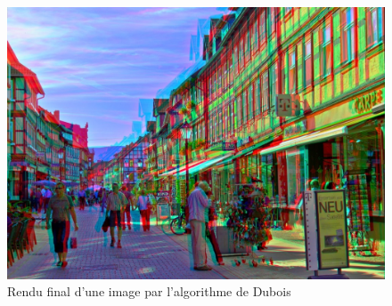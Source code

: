 \begin{figure}[H]
		\centering
		\includegraphics[scale=0.9]{algoDubois.png}
		\caption{\label{fig:algoDubois} Rendu final d’une image par l’algorithme de Dubois \protect \footnotemark }
\end{figure}
	
	
